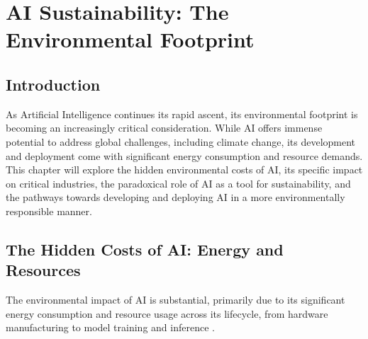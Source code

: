 \chapter{AI Sustainability: The Environmental Footprint}
\label{chap:ai_sustainability}

\section{Introduction}
\label{sec:sustainability_introduction}
As Artificial Intelligence continues its rapid ascent, its environmental footprint is becoming an increasingly critical consideration. While AI offers immense potential to address global challenges, including climate change, its development and deployment come with significant energy consumption and resource demands. This chapter will explore the hidden environmental costs of AI, its specific impact on critical industries, the paradoxical role of AI as a tool for sustainability, and the pathways towards developing and deploying AI in a more environmentally responsible manner.

\section{The Hidden Costs of AI: Energy and Resources}
\label{sec:hidden_costs_of_ai}
The environmental impact of AI is substantial, primarily due to its significant energy consumption and resource usage across its lifecycle, from hardware manufacturing to model training and inference \parencite{WikipediaAISustainability2023}.

